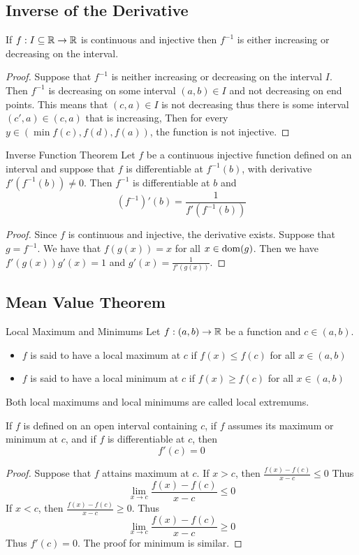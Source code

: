 \documentclass[a4paper]{article}
\begin{document}
\subsection{Inverse of the Derivative}
\begin{thm}{}{} If $f:I\subseteq\mathbb{R}\to\mathbb{R}$ is continuous and injective then $f^{-1}$ is either increasing or decreasing on the interval. \tcbline
\begin{proof} Suppose that $f^{-1}$ is neither increasing or decreasing on the interval $I$. Then $f^{-1}$ is decreasing on some interval $(a,b)\in I$ and not decreasing on end points. This means that $(c,a)\in I$ is not decreasing thus there is some interval $(c',a)\in(c,a)$ that is increasing, Then for every $y\in(\min{f(c),f(d)},f(a))$, the function is not injective. 
\end{proof}
\end{thm}

\begin{thm}{Inverse Function Theorem}{} Let $f$ be a continuous injective function defined on an interval and suppose that $f$ is differentiable at $f^{-1}(b)$, with derivative $f'\left(f^{-1}(b)\right)\neq0$. Then $f^{-1}$ is differentiable at $b$ and $$\left(f^{-1}\right)'(b)=\frac{1}{f'\left(f^{-1}(b)\right)}$$ \tcbline
\begin{proof} Since $f$ is continuous and injective, the derivative exists. Suppose that $g=f^{-1}$. We have that $f(g(x))=x$ for all $x\in\operatorname{dom}(g)$. Then we have $f'(g(x))g'(x)=1$ and $g'(x)=\frac{1}{f'(g(x))}$. 
\end{proof}
\end{thm}

\subsection{Mean Value Theorem}
\begin{defn}{Local Maximum and Minimums}{} Let $f:(a,b)\to\mathbb{R}$ be a function and $c\in(a,b)$. 
\begin{itemize}
\item $f$ is said to have a local maximum at $c$ if $f(x)\leq f(c)$ for all $x\in(a,b)$
\item $f$ is said to have a local minimum at $c$ if $f(x)\geq f(c)$ for all $x\in(a,b)$
\end{itemize}
Both local maximums and local minimums are called local extremums. 
\end{defn}

\begin{thm}{}{} If $f$ is defined on an open interval containing $c$, if $f$ assumes its maximum or minimum at $c$, and if $f$ is differentiable at $c$, then $$f'(c)=0$$ \tcbline
\begin{proof} Suppose that $f$ attains maximum at $c$. If $x>c$, then $\frac{f(x)-f(c)}{x-c}\leq 0$ Thus $$\lim_{x\to c}\frac{f(x)-f(c)}{x-c}\leq 0$$ If $x<c$, then $\frac{f(x)-f(c)}{x-c}\geq 0$. Thus $$\lim_{x\to c}\frac{f(x)-f(c)}{x-c}\geq 0$$ Thus $f'(c)=0$. The proof for minimum is similar. 
\end{proof}
\end{thm}
\end{document}
